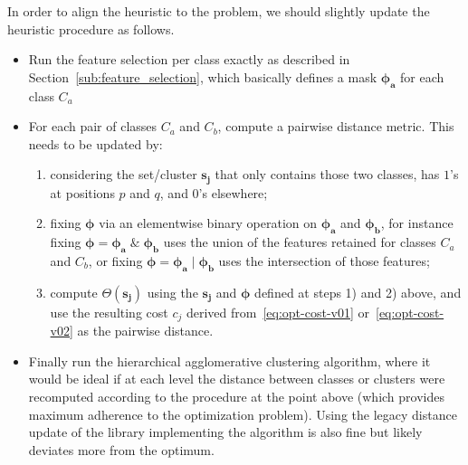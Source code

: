 In order to align the heuristic to the problem, we should slightly update the heuristic procedure as follows.
\begin{itemize}
    \item Run the feature selection per class exactly as described in Section~\ref{sub:feature_selection}, which basically defines a mask $\pmb{\phi_a}$ for each class $C_a$
    \item For each pair of classes $C_a$ and $C_b$, compute a pairwise distance metric. This needs to be updated by:
    \begin{enumerate}
        \item considering the set/cluster $\pmb{s_j}$ that only contains those two classes, \ie has $1$'s at positions $p$ and $q$, and $0$'s elsewhere;
        \item fixing $\pmb{\phi}$ via an elementwise binary operation on $\pmb{\phi_a}$ and $\pmb{\phi_b}$, for instance fixing $\pmb{\phi}=\pmb{\phi_a}\;\&\;\pmb{\phi_b}$ uses the union of the features retained for classes $C_a$ and $C_b$, or fixing $\pmb{\phi}=\pmb{\phi_a}\;|\;\pmb{\phi_b}$ uses the intersection of those features;
        \item compute $\Theta(\pmb{s_j})$ using the $\pmb{s_j}$ and $\pmb{\phi}$ defined at steps 1) and 2) above, and use the resulting cost $c_j$ derived from~\eqref{eq:opt-cost-v01} or~\eqref{eq:opt-cost-v02} as the pairwise distance.
    \end{enumerate}
    \item Finally run the hierarchical agglomerative clustering algorithm, where it would be ideal if at each level the distance between classes or clusters were recomputed according to the procedure at the point above (which provides maximum adherence to the optimization problem). Using the legacy distance update of the library implementing the algorithm is also fine but likely deviates more from the optimum.
\end{itemize}
